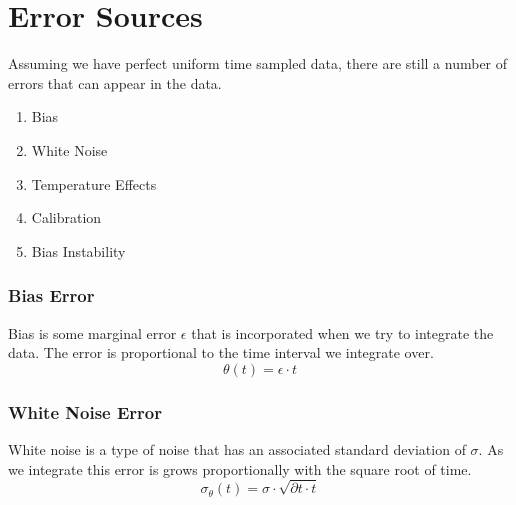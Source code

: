 \documentclass[10pt]{beamer}
\begin{document}

\section{Error Sources}

\begin{frame}
Assuming we have perfect uniform time sampled data, there are still a number of errors that can appear in the data.
\begin{enumerate}
\item Bias
\item White Noise
\item Temperature Effects
\item Calibration
\item Bias Instability
\end{enumerate}
\end{frame}

\begin{frame}
\frametitle{Bias Error}
Bias is some marginal error $\epsilon$ that is incorporated when we try to integrate the data. The error is proportional to the time interval we integrate over.
\begin{equation*}
\theta(t) = \epsilon \cdot t
\end{equation*}
\end{frame}

\begin{frame}
\frametitle{White Noise Error}
White noise is a type of noise that has an associated standard deviation of $\sigma$. As we integrate this error is grows proportionally with the square root of time. 
\begin{equation*}
\sigma_{\theta}(t) = \sigma \cdot \sqrt{\partial t \cdot t}
\end{equation*}
\end{frame}
\end{document}
